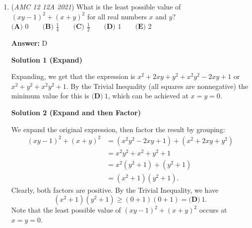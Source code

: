 \begin{enumerate}
\textbf{Solution 5 (Simpler Ratios)}

This could in a way be considered a more efficient/alternate version of Solution 4. Since the problem mentions that there is initially a $\frac{1}{3}$ chance of getting a red card, we can represent the number of red cards as $\frac{x}{3}$, where $x$ is the number of cards in the deck originally. Since the modification to the deck makes no changes to the number of red cards, you can see that if there is a $\frac{1}{4}$ probability of having a red card in a deck of $x+4$ cards, $\frac{x}{3} = \frac{x+4}{4}$. Solving this for $x$ gives $x=\boxed{\textbf{(C) }12}.$




\textbf{Solution 6 (Observation)}

Notice that in a deck with 1 red card and 2 black cards, the probability of a red ball is $\frac{1}{3}$

 Adding a single black card would make the chance $\frac{1}{4}$

 If we scale this deck by 4, making so that there are 4 red cards and 8 black cards, the original chance is still $\frac{1}{3}$

 Adding 4 black cards will make the chance $\frac{1}{4}$

 The answer is $\boxed{\textbf{(C) }12}$.

 


 


	\item (\textit{AMC 12 12A 2021}) What is the least possible value of $(xy-1)^2+(x+y)^2$ for all real numbers $x$ and $y?$
$\textbf{(A) }0 \qquad \textbf{(B) }\frac14 \qquad \textbf{(C) }\frac12 \qquad \textbf{(D) }1 \qquad \textbf{(E) }2$

 \textbf{Answer: }D



\textbf{Solution 1 (Expand)}

Expanding, we get that the expression is $x^2+2xy+y^2+x^2y^2-2xy+1$ or $x^2+y^2+x^2y^2+1$. By the Trivial Inequality (all squares are nonnegative) the minimum value for this is $\boxed{\textbf{(D)} ~1}$, which can be achieved at $x=y=0$. 

 



\textbf{Solution 2 (Expand and then Factor)}

We expand the original expression, then factor the result by grouping:
 \begin{align*} (xy-1)^2+(x+y)^2&=\left(x^2y^2-2xy+1\right)+\left(x^2+2xy+y^2\right) \\ &=x^2y^2+x^2+y^2+1 \\ &=x^2\left(y^2+1\right)+\left(y^2+1\right) \\ &=\left(x^2+1\right)\left(y^2+1\right). \end{align*}
Clearly, both factors are positive. By the Trivial Inequality, we have 
 \[\left(x^2+1\right)\left(y^2+1\right)\geq\left(0+1\right)\left(0+1\right)=\boxed{\textbf{(D)} ~1}.\]Note that the least possible value of $(xy-1)^2+(x+y)^2$ occurs at $x=y=0.$





\end{enumerate}
